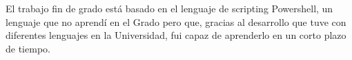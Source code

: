 \documentclass[a4paper, 12pt]{book}
\begin{document}
El trabajo fin de grado está basado en el lenguaje de scripting Powershell, un lenguaje que no aprendí en el Grado pero que, gracias al desarrollo que tuve con diferentes lenguajes en la Universidad, fui capaz de aprenderlo en un corto plazo de tiempo.


\cleardoublepage


\end{document}

